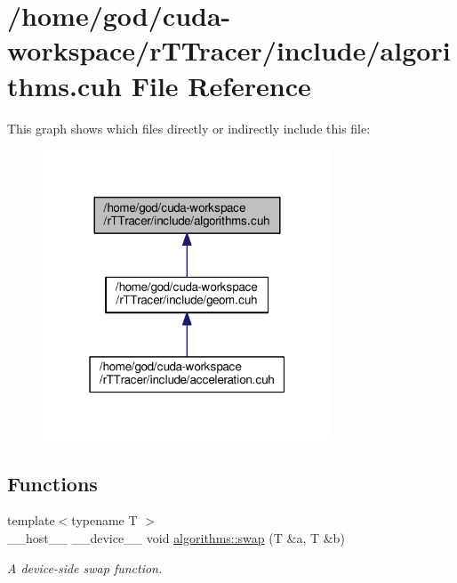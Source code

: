 \hypertarget{algorithms_8cuh}{}\section{/home/god/cuda-\/workspace/r\+T\+Tracer/include/algorithms.cuh File Reference}
\label{algorithms_8cuh}
This graph shows which files directly or indirectly include this file\+:
\nopagebreak
\begin{figure}[H]
\begin{center}
\leavevmode
\includegraphics[width=244pt]{algorithms_8cuh__dep__incl}
\end{center}
\end{figure}
\subsection*{Functions}
\begin{DoxyCompactItemize}
\item 
{\footnotesize template$<$typename T $>$ }\\\+\_\+\+\_\+host\+\_\+\+\_\+ \+\_\+\+\_\+device\+\_\+\+\_\+ void \hyperlink{group__auxiliary__algorithms_ga69ab10800d18d0a10396e4acf436f3ef}{algorithms\+::swap} (T \&a, T \&b)
\begin{DoxyCompactList}\small\item\em A device-\/side swap function. \end{DoxyCompactList}\end{DoxyCompactItemize}
